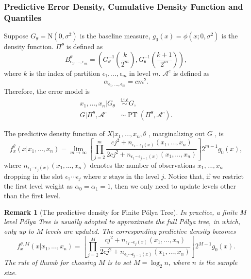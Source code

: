 \documentclass[12pt]{article}
\newtheorem{rmk}[thm]{Remark}
\newcommand{\polya}{P\'{o}lya}
\newcommand{\iid}{\stackrel{\text{i.i.d}}{\sim}}
\DeclareMathOperator{\pt}{PT}
\begin{document}
\subsubsection{Predictive Error Density, Cumulative Density Function
  and Quantiles}
Suppose $G_{\theta} = \mathrm{N}(0, \sigma^2)$ is the baseline
measure, $g_0(x) = \phi(x; 0, \sigma^2)$ is the density
function. $\Pi^{\theta}$ is defined as
\begin{displaymath}
  B^{\theta}_{\epsilon_1, \ldots, \epsilon_m} = \left( G^{-1}_{\theta}
    \left( \frac{k}{2^m} \right) , G^{-1}_{\theta}\left( \frac{k+1}{2^m} \right) \right),
\end{displaymath}
where $k$ is the index of partition $\epsilon_1, \ldots, \epsilon_m$
in level $m$. $\mathcal{A}^c$ is defined as 
\begin{displaymath}
  \alpha_{\epsilon_1, \ldots, \epsilon_m} = cm^2.
\end{displaymath}
Therefore, the error model is 
\begin{align*}
  x_1, \ldots, x_n |G_{\theta} & \iid G, \\
  G|\Pi^{\theta}, \mathcal{A}^{c} & \sim \pt (\Pi^{\theta},
  \mathcal{A}^{c}). 
\end{align*}

The predictive density function of $X|x_1, \ldots, x_n, \theta$ ,
marginalizing out $G$ , is  
\begin{equation}
  \label{eq:4}
  f_x^{\theta} (x|x_1, \ldots, x_n)  = \lim_{m \to \infty} \left[
    \prod_{j=2}^m \frac{cj^2 + n_{\epsilon_1 \cdots \epsilon_j(x) }(x_1 , \ldots, x_n)}{2cj^2
      + n_{\epsilon_1 \cdots \epsilon_{j-1}(x)}(x_1, \ldots, x_n)}
  \right]2^{m-1} g_0(x),
\end{equation}
where $n_{\epsilon_1 \cdots \epsilon_j(x) }(x_1 , \ldots, x_n)$
denotes the number of observations $x_1, \ldots, x_n$ dropping in the
slot $\epsilon_1 \cdots \epsilon_j$ where $x$ stays in the level
$j$. Notice that, if  we restrict the first level weight as
$\alpha_0=\alpha_1=1$, then we only need to update levels other than
the first level.

\begin{rmk}[The predictive density for Finite \polya{} Tree]
  In practice, a finite $M$ level \polya{} Tree is usually adopted to
  approximate the full \polya{} tree, in which, only up to $M$ levels are
  updated. The corresponding predictive density becomes 
  \begin{equation}
    \label{eq:5}
    f_x^{\theta, M} (x|x_1, \ldots, x_n)  =  \left[
      \prod_{j=2}^M \frac{cj^2 + n_{\epsilon_1 \cdots \epsilon_j(x) }(x_1 , \ldots, x_n)}{2cj^2
        + n_{\epsilon_1 \cdots \epsilon_{j-1}(x)}(x_1, \ldots, x_n)}
    \right]2^{M-1} g_0(x).
  \end{equation}
  The rule of thumb for choosing $M$ is to set $M=\log_2n$, where $n$ is
  the sample size.
\end{rmk}
\end{document}
